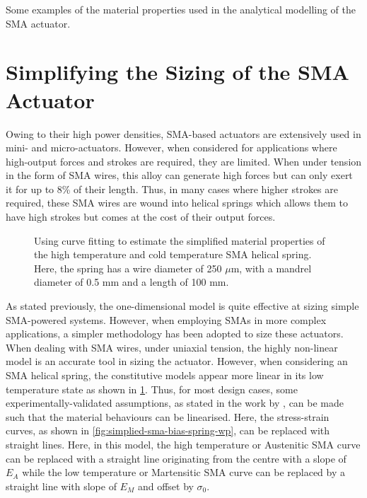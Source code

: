 \begin{table}[hbt]
    \centering
    \caption{Some examples of the material properties used in the analytical modelling of the SMA actuator.}
    \label{tab:brinson-material-properties}
    
\end{table}
\section{Simplifying the Sizing of the SMA Actuator}\label{sec:simplified-sma-model}
Owing to their high power densities, SMA-based actuators are extensively used in mini- and micro-actuators. However, when considered for applications where high-output forces and strokes are required, they are limited. When under tension in the form of SMA wires, this alloy can generate high forces but can only exert it for up to 8\% of their length. Thus, in many cases where higher strokes are required, these SMA wires are wound into helical springs which allows them to have high strokes but comes at the cost of their output forces.

\begin{figure}[hbt]
    \centering
    \resizebox{0.85\textwidth}{!}{}
    \caption[Using curve fitting to estimate the simplified material properties of the high temperature and cold temperature SMA helical spring]{Using curve fitting to estimate the simplified material properties of the high temperature and cold temperature SMA helical spring. Here, the spring has a wire diameter of 250 $\mu$m, with a mandrel diameter of 0.5 mm and a length of 100 mm.}
    \label{fig:sma-coil-curve-fit}
\end{figure}

As stated previously, the one-dimensional model is quite effective at sizing simple SMA-powered systems. However, when employing SMAs in more complex applications, a simpler methodology has been adopted to size these actuators. When dealing with SMA wires, under uniaxial tension, the highly non-linear \cite{brinsonOneDimensionalConstitutiveBehavior1993} model is an accurate tool in sizing the actuator. However, when considering an SMA helical spring, the constitutive models appear more linear in its low temperature state as shown in \cref{fig:sma-coil-curve-fit}. Thus, for most design cases, some experimentally-validated assumptions, as stated in the work by \cite{dragoniDesignDevelopmentAdvanced2021}, can be made such that the material behaviours can be linearised. Here, the stress-strain curves, as shown in \cref{fig:simplied-sma-bias-spring-wp}, can be replaced with straight lines. Here, in this model, the high temperature or Austenitic SMA curve can be replaced with a straight line originating from the centre with a slope of $E_A$ while the low temperature or Martensitic SMA curve can be replaced by a straight line with slope of $E_M$ and offset by $\sigma_0$.

